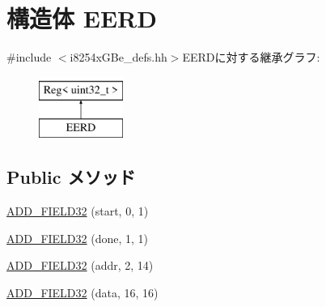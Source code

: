 \hypertarget{structiGbReg_1_1Regs_1_1EERD}{
\section{構造体 EERD}
\label{structiGbReg_1_1Regs_1_1EERD}
}


{\ttfamily \#include $<$i8254xGBe\_\-defs.hh$>$}EERDに対する継承グラフ:\begin{figure}[H]
\begin{center}
\leavevmode
\includegraphics[height=2cm]{structiGbReg_1_1Regs_1_1EERD}
\end{center}
\end{figure}
\subsection*{Public メソッド}
\begin{DoxyCompactItemize}
\item 
\hyperlink{structiGbReg_1_1Regs_1_1EERD_ae56b448e0a0d29e270a7662e0eb4e5d8}{ADD\_\-FIELD32} (start, 0, 1)
\item 
\hyperlink{structiGbReg_1_1Regs_1_1EERD_aad490284e58d3b38a031043748dfdca6}{ADD\_\-FIELD32} (done, 1, 1)
\item 
\hyperlink{structiGbReg_1_1Regs_1_1EERD_ad793234beb15f6253c1f5c2f5091bfee}{ADD\_\-FIELD32} (addr, 2, 14)
\item 
\hyperlink{structiGbReg_1_1Regs_1_1EERD_ac595d67f8f6504bd50278ecd043e0bd6}{ADD\_\-FIELD32} (data, 16, 16)
\end{DoxyCompactItemize}


